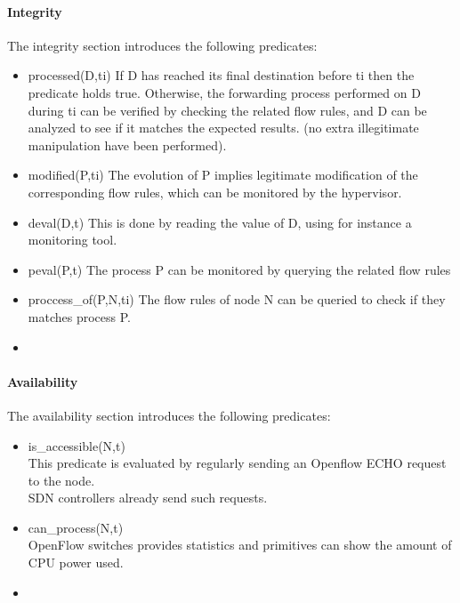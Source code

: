 \paragraph{Integrity}
The integrity section introduces the following predicates:
\begin{itemize}

\item processed(D,ti)
\newline
If D has reached its final destination before ti then the predicate holds true.
Otherwise, the forwarding process performed on D during ti can be verified by checking the related flow rules, and D can be analyzed to see if it matches the expected results. (\ie no extra illegitimate manipulation have been performed).

\item modified(P,ti)
\newline
The evolution of P implies legitimate modification of the corresponding flow rules, which can be monitored by the hypervisor.

\item deval(D,t)
\newline
This is done by reading the value of D, using for instance a monitoring tool.

\item peval(P,t)
\newline
The process P can be monitored by querying the related flow rules

\item proccess\_of(P,N,ti)
\newline
The flow rules of node N can be queried to check if they matches process P.

\item {}
\end{itemize}

\paragraph{Availability}
The availability section introduces the following predicates:
\begin{itemize}
\item is\_accessible(N,t)
\\ This predicate is evaluated by regularly sending an Openflow ECHO request to the node.
\\ SDN controllers already send such requests.

\item can\_process(N,t)
\\ OpenFlow switches provides statistics and primitives can show the amount of CPU power used.

\item {}
\end{itemize}

